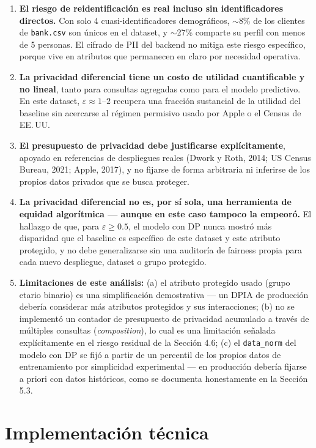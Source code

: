 \documentclass[11pt,a4paper]{article}
\newcommand{\eps}{\ensuremath{\varepsilon}}
\begin{document}
\begin{enumerate}[leftmargin=1.4em]
\item \textbf{El riesgo de reidentificación es real incluso sin identificadores directos.} Con
solo 4 cuasi-identificadores demográficos, $\sim$8\% de los clientes de \texttt{bank.csv} son
únicos en el dataset, y $\sim$27\% comparte su perfil con menos de 5 personas. El cifrado de PII
del backend no mitiga este riesgo específico, porque vive en atributos que permanecen en claro
por necesidad operativa.
\item \textbf{La privacidad diferencial tiene un costo de utilidad cuantificable y no lineal},
tanto para consultas agregadas como para el modelo predictivo. En este dataset, $\eps\approx1$--$2$
recupera una fracción sustancial de la utilidad del baseline sin acercarse al régimen permisivo
usado por Apple o el Census de EE.\,UU.
\item \textbf{El presupuesto de privacidad debe justificarse explícitamente}, apoyado en
referencias de despliegues reales (Dwork y Roth, 2014; US Census Bureau, 2021; Apple, 2017), y no
fijarse de forma arbitraria ni inferirse de los propios datos privados que se busca proteger.
\item \textbf{La privacidad diferencial no es, por sí sola, una herramienta de equidad
algorítmica --- aunque en este caso tampoco la empeoró.} El hallazgo de que, para $\eps\geq0.5$,
el modelo con DP nunca mostró más disparidad que el baseline es específico de este dataset y este
atributo protegido, y no debe generalizarse sin una auditoría de fairness propia para cada nuevo
despliegue, dataset o grupo protegido.
\item \textbf{Limitaciones de este análisis:} (a) el atributo protegido usado (grupo etario
binario) es una simplificación demostrativa --- un DPIA de producción debería considerar más
atributos protegidos y sus interacciones; (b) no se implementó un contador de presupuesto de
privacidad acumulado a través de múltiples consultas (\emph{composition}), lo cual es una
limitación señalada explícitamente en el riesgo residual de la Sección 4.6; (c) el
\texttt{data\_norm} del modelo con DP se fijó a partir de un percentil de los propios datos de
entrenamiento por simplicidad experimental --- en producción debería fijarse a priori con datos
históricos, como se documenta honestamente en la Sección 5.3.
\end{enumerate}

\section{Implementación técnica}
\end{document}

